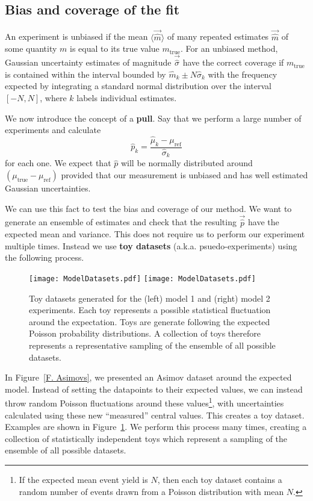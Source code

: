 \subsection{Bias and coverage of the fit}
\label{S. CLsInAction::BiasCoverage}

An experiment is unbiased if the mean $\langle \vec{\hat{m}} \rangle$ of many repeated estimates $\vec{\hat{m}}$ of some quantity $m$ is equal to its true value $m_\text{true}$. For an unbiased method, Gaussian uncertainty estimates of magnitude $\vec{\hat{\sigma}}$ have the correct coverage if $m_\text{true}$ is contained within the interval bounded by $\hat m_k \pm N\hat\sigma_k$ with the frequency expected by integrating a standard normal distribution over the interval $[-N,N]$, where $k$ labels individual estimates.

We now introduce the concept of a \textbf{pull}. Say that we perform a large number of experiments and calculate
\begin{equation}
\hat p_k = \frac{\hat \mu_k - \mu_\text{ref}}{\hat \sigma_k}
\end{equation}
for each one. We expect that $\hat p$ will be normally distributed around $\left(\mu_\text{true}-\mu_\text{ref}\right)$ provided that our measurement is unbiased and has well estimated Gaussian uncertainties.

We can use this fact to test the bias and coverage of our method. We want to generate an ensemble of estimates and check that the resulting $\vec{\hat{p}}$ have the expected mean and variance. This does not require us to perform our experiment multiple times. Instead we use \textbf{toy datasets} (a.k.a. psuedo-experiments) using the following process.

\begin{figure}[t!]
\centering
\texttt{[image: ModelDatasets.pdf]}
\texttt{[image: ModelDatasets.pdf]}
\caption{Toy datasets generated for the (left) model 1 and (right) model 2 experiments. Each toy represents a possible statistical fluctuation around the expectation. Toys are generate following the expected Poisson probability distributions. A collection of toys therefore represents a representative sampling of the ensemble of all possible datasets.}
\label{F. Toys}
\end{figure}

In Figure~\ref{F. Asimovs}, we presented an Asimov dataset around the expected model. Instead of setting the datapoints to their expected values, we can instead throw random Poisson fluctuations around these values\footnote{If the expected mean event yield is $N$, then each toy dataset contains a random number of events drawn from a Poisson distribution with mean $N$.}, with uncertainties calculated using these new ``measured'' central values. This creates a toy dataset. Examples are shown in Figure~\ref{F. Toys}. We perform this process many times, creating a collection of statistically independent toys which represent a sampling of the ensemble of all possible datasets.

